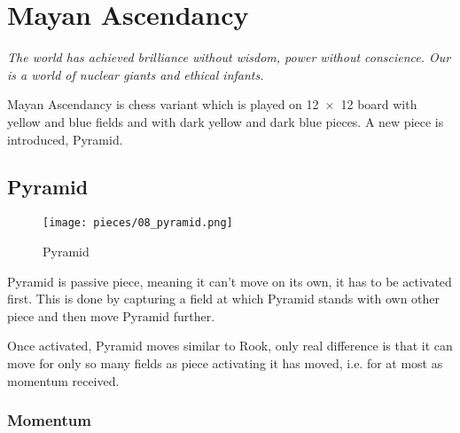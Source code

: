 

\chapter*{Mayan Ascendancy}
\label{ch:Mayan Ascendancy}

\begin{flushright}
\parbox{0.8\textwidth}{
\emph{The world has achieved brilliance without wisdom, power without
conscience. Our is a world of nuclear giants and ethical infants.\newline
{} } }
\end{flushright}

\noindent
Mayan Ascendancy is chess variant which is played on 12~$\times$~12 board
with yellow and blue fields and with dark yellow and dark blue pieces.
A new piece is introduced, Pyramid.

\clearpage %

\section*{Pyramid}
\label{sec:Mayan Ascendancy/Pyramid}

\noindent
\begin{wrapfigure}[12]{l}{0.4\textwidth}
\centering
\texttt{[image: pieces/08\_pyramid.png]}
\caption{Pyramid}
\label{fig:08_pyramid}
\end{wrapfigure}
Pyramid is passive piece, meaning it can't move on its own, it has to be
activated first. This is done by capturing a field at which Pyramid stands
with own other piece and then move Pyramid further.

Once activated, Pyramid moves similar to Rook, only real difference is that
it can move for only so many fields as piece activating it has moved, i.e.
for at most as momentum received.

\subsection*{Momentum}
\label{sec:Mayan Ascendancy/Pyramid/Momentum}

